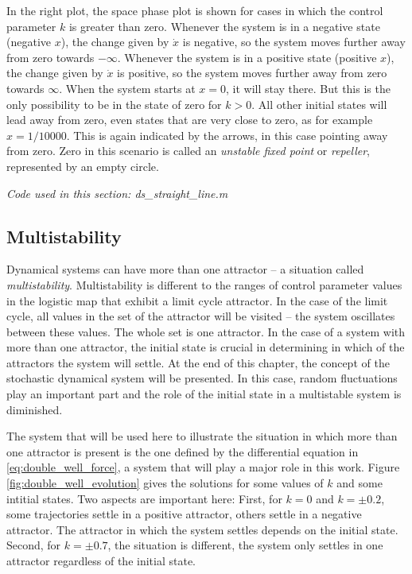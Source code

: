 In the right plot, the space phase plot is shown for cases in which the control parameter $k$ is greater than zero. Whenever the system is in a negative state (negative $x$), the change given by $\dot{x}$ is negative, so the system moves further away from zero towards $-\infty$. Whenever the system is in a positive state \largerpage(positive $x$), the change given by $\dot{x}$ is positive, so the system moves further away from zero towards $\infty$. When the system starts at $x = 0$, it will stay there. But this is the only possibility to be in the state of zero for $k > 0$. All other initial states will lead away from zero, even states that are very close to zero, as for example $x = 1/10000$. This is again indicated by the arrows, in this case pointing away from zero. Zero in this scenario is called an \emph{unstable fixed point} or \emph{repeller}, represented by an empty circle.

\medskip\noindent \textit{Code used in this section: ds\_straight\_line.m}

\subsection{Multistability}

Dynamical systems can have more than one attractor -- a situation called \emph{multistability}. Multistability is different to the ranges of control parameter values in the logistic map that exhibit a limit cycle attractor. In the case of the limit cycle, all values in the set of the attractor will be visited – the system oscillates between these values. The whole set is one attractor. In the case of a system with more than one attractor, the initial state is crucial in determining in which of the attractors the system will settle. At the end of this chapter, the concept of the stochastic dynamical system will be presented. In this case, random fluctuations play an important part and the role of the initial state in a multistable system is diminished.

The system that will be used here to illustrate the situation in which more than one attractor is present is the one defined by the differential equation in \ref{eq:double_well_force}, a system that will play a major role in this work. Figure \ref{fig:double_well_evolution} gives the solutions for some values of $k$ and some intitial states. Two aspects are important here: First, for $k = 0$ and $k = \pm0.2$, some trajectories settle in a positive attractor, others settle in a negative attractor. The attractor in which the system settles depends on the initial state. Second, for $k = \pm0.7$, the situation is different, the system only settles in one attractor regardless of the initial state.

